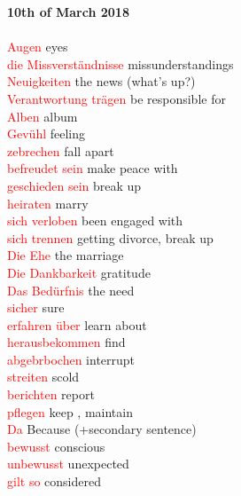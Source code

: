 \documentclass{article}
\begin{document}
\begin{multicols}{2}
	
	\textbf{10th of March 2018}\\\\
	\textcolor{red}{Augen} eyes\\
	\textcolor{red}{die Missverständnisse} missunderstandings\\
	\textcolor{red}{Neuigkeiten} the news (what's up?)\\
	\textcolor{red}{Verantwortung trägen} be responsible for\\
	\textcolor{red}{Alben} album\\
	\textcolor{red}{Gevühl} feeling\\
	\textcolor{red}{zebrechen} fall apart\\
	\textcolor{red}{befreudet sein} make peace with\\
	\textcolor{red}{geschieden sein} break up\\
	\textcolor{red}{heiraten} marry\\
	\textcolor{red}{sich verloben} been engaged with\\
	\textcolor{red}{sich trennen} getting divorce, break up\\
	\textcolor{red}{Die Ehe} the marriage\\
	\textcolor{red}{Die Dankbarkeit} gratitude\\
	\textcolor{red}{Das Bedürfnis} the need\\
	\textcolor{red}{sicher} sure\\
	\textcolor{red}{erfahren über} learn about\\
	\textcolor{red}{herausbekommen} find\\
	\textcolor{red}{abgebrbochen} interrupt \\ 
	\textcolor{red}{streiten} scold \\
	\textcolor{red}{berichten} report \\
	\textcolor{red}{pflegen} keep , maintain \\
	\textcolor{red}{Da} Because (+secondary sentence)\\
	\textcolor{red}{bewusst} conscious\\
	\textcolor{red}{unbewusst} unexpected\\
	\textcolor{red}{gilt so} considered\\\\
	

\end{multicols}
\end{document}
